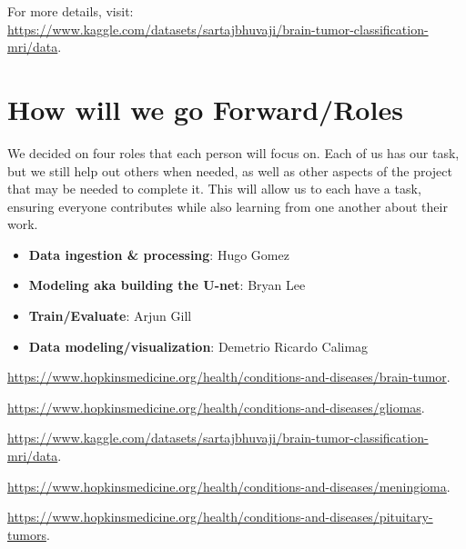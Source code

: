 \documentclass[11pt]{article}
\begin{document}
\noindent For more details, visit: \\
\href{https://www.kaggle.com/datasets/sartajbhuvaji/brain-tumor-classification-mri/data}{https://www.kaggle.com/datasets/sartajbhuvaji/brain-tumor-classification-mri/data}.

\section{How will we go Forward/Roles}
We decided on four roles that each person will focus on. Each of us has our task, but we still help out others
when needed, as well as other aspects of the project that may be needed to complete it.
This will allow us to each have a task, ensuring everyone contributes while also learning from one another about their work.
\begin{itemize}
    \item \textbf{Data ingestion \& processing}: Hugo Gomez
    \item \textbf{Modeling aka building the U-net}: Bryan Lee
    \item \textbf{Train/Evaluate}: Arjun Gill
    \item \textbf{Data modeling/visualization}: Demetrio Ricardo Calimag
\end{itemize}

\newpage

\begin{thebibliography}{4}
    \url{https://www.hopkinsmedicine.org/health/conditions-and-diseases/brain-tumor}.
    
    \url{https://www.hopkinsmedicine.org/health/conditions-and-diseases/gliomas}.

    \url{https://www.kaggle.com/datasets/sartajbhuvaji/brain-tumor-classification-mri/data}.

    \url{https://www.hopkinsmedicine.org/health/conditions-and-diseases/meningioma}.

    \url{https://www.hopkinsmedicine.org/health/conditions-and-diseases/pituitary-tumors}.
\end{thebibliography}
\end{document}
